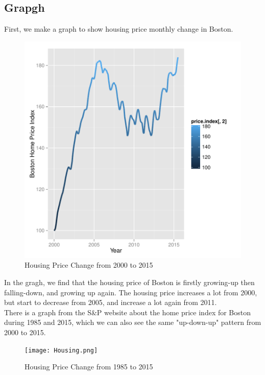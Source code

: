 \documentclass{report}
\begin{document}
\subsection{Grapgh}
First, we make a graph to show housing price monthly change in Boston.
\begin{figure}[H]
 \begin{center}
\includegraphics{homeprice-001}
 \caption{Housing Price Change from 2000 to 2015}
 \end{center}
\end{figure}
In the gragh, we find that the housing price of Boston is firstly growing-up then falling-down, and growing up again. The housing price increases a lot from 2000, but start to decrease from 2005, and increase a lot again from 2011.\\

There is a graph from the S\&P website about the home price index for Boston during 1985 and 2015, which we can also see the same "up-down-up" pattern from 2000 to 2015.

\begin{figure}[H]
  \centering
  \texttt{[image: Housing.png]}
  \caption{Housing Price Change from 1985 to 2015}
\end{figure}
\end{document}
